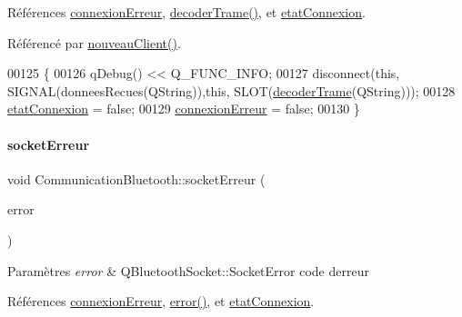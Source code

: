 Références \hyperlink{class_communication_bluetooth_a7b313bd3b054faaf59244a297880bf7a}{connexion\+Erreur}, \hyperlink{class_communication_bluetooth_a6b53f12131d9323cec8f2a03fe716e6a}{decoder\+Trame()}, et \hyperlink{class_communication_bluetooth_ae6ab740d6e6673fcc9a9f141bd295bc4}{etat\+Connexion}.



Référencé par \hyperlink{class_communication_bluetooth_ab88c9bb8a1bd2c68e3d14fc3615be888}{nouveau\+Client()}.


\begin{DoxyCode}
00125 \{
00126     qDebug() << Q\_FUNC\_INFO;
00127     disconnect(\textcolor{keyword}{this}, SIGNAL(donneesRecues(QString)),\textcolor{keyword}{this}, SLOT(\hyperlink{class_communication_bluetooth_a6b53f12131d9323cec8f2a03fe716e6a}{decoderTrame}(QString)));
00128     \hyperlink{class_communication_bluetooth_ae6ab740d6e6673fcc9a9f141bd295bc4}{etatConnexion} = \textcolor{keyword}{false};
00129     \hyperlink{class_communication_bluetooth_a7b313bd3b054faaf59244a297880bf7a}{connexionErreur} = \textcolor{keyword}{false};
00130 \}
\end{DoxyCode}
\mbox{\label{class_communication_bluetooth_a41a4f8ab7deffd296d04018db20314a1}} 
\paragraph{\texorpdfstring{socket\+Erreur}{socketErreur}}
{\footnotesize\ttfamily void Communication\+Bluetooth\+::socket\+Erreur (\begin{DoxyParamCaption}\item[{Q\+Bluetooth\+Socket\+::\+Socket\+Error}]{error }\end{DoxyParamCaption})\hspace{0.3cm}{\ttfamily [slot]}}


\begin{DoxyParams}{Paramètres}
{\em error} & Q\+Bluetooth\+Socket\+::\+Socket\+Error code d\textquotesingle{}erreur \\
\hline
\end{DoxyParams}


Références \hyperlink{class_communication_bluetooth_a7b313bd3b054faaf59244a297880bf7a}{connexion\+Erreur}, \hyperlink{class_communication_bluetooth_a6e0d7054012e11af9d55d6d4f5764259}{error()}, et \hyperlink{class_communication_bluetooth_ae6ab740d6e6673fcc9a9f141bd295bc4}{etat\+Connexion}.


